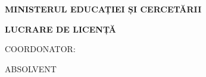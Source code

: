 \begin{titlepage}
\thispagestyle{empty}
\begin{center}
\vspace*{0.7cm}

{\bfseries MINISTERUL EDUCAȚIEI ȘI CERCETĂRII\par}
{\bfseries \universitate\par}
{\bfseries \facultate\par}
{\bfseries \specializare\par}
{\bfseries \formaInvatamant\par}

\vspace*{4.9cm}

{\bfseries\fontsize{16}{18}\selectfont LUCRARE DE LICENȚĂ\par}

\vspace*{4.2cm}

\noindent
\begin{minipage}[t]{0.42\textwidth}
\raggedright
COORDONATOR:\par
\coordonatorTitlu{} \textbf{\coordonatorNume}
\end{minipage}
\hfill
\begin{minipage}[t]{0.30\textwidth}
\raggedright
ABSOLVENT\par
\textbf{\absolvent}
\end{minipage}

\vfill

{\localitate\par}
{\anUniversitar\par}
\vspace*{0.5cm}
\end{center}
\end{titlepage}
